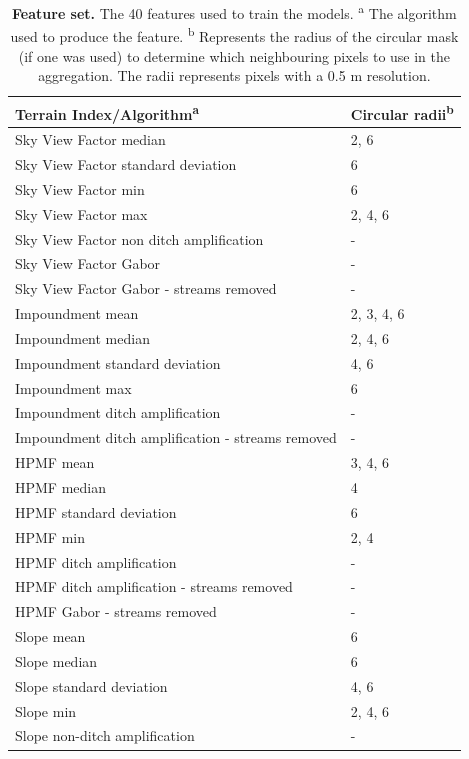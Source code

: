\documentclass[11pt, review]{elsarticle} %
\begin{document}
\begin{table} [!htb]
\centering
    {\begin{tabular}{ll}
      \textbf{Terrain Index/Algorithm}\textsuperscript{a} & \textbf{Circular radii}\textsuperscript{b} \\ 
      \hline
      Sky View Factor median &2, 6 \\
      Sky View Factor standard deviation & 6 \\
      Sky View Factor min & 6 \\
      Sky View Factor max & 2, 4, 6 \\
      Sky View Factor non ditch amplification & - \\ 
      Sky View Factor Gabor & - \\
      Sky View Factor Gabor - streams removed & -\\
      
      Impoundment mean & 2, 3, 4, 6 \\
      Impoundment median & 2, 4, 6 \\
      Impoundment standard deviation & 4, 6 \\
      Impoundment max & 6 \\
      Impoundment ditch amplification & - \\
      Impoundment ditch amplification - streams removed & - \\
      
      HPMF mean & 3, 4, 6 \\
      HPMF median & 4 \\
      HPMF standard deviation & 6 \\
      HPMF min & 2, 4 \\
      HPMF ditch amplification & - \\
      HPMF ditch amplification - streams removed & - \\
      HPMF Gabor - streams removed & -\\
      
      Slope mean & 6 \\
      Slope median & 6 \\
      Slope standard deviation & 4, 6 \\
      Slope min & 2, 4, 6 \\
      Slope non-ditch amplification & - \\
      \hline
    \end{tabular}}
    \caption{\textbf{Feature set.} The 40 features used to train the models.
    \newline \textsuperscript{a} The algorithm used to produce the feature. \newline
        \textsuperscript{b} Represents the radius of the circular mask (if one was used) to determine which neighbouring pixels to use in the aggregation. The radii represents pixels with a 0.5 m resolution.}
    \label{featuretable}
\end{table}
\end{document}
